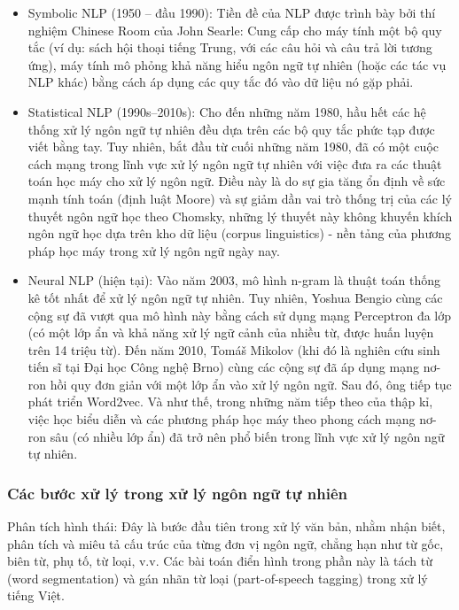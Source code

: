 \begin{itemize}
    \item Symbolic NLP (1950 – đầu 1990): Tiền đề của NLP được trình bày bởi thí nghiệm Chinese Room của John Searle: Cung cấp cho máy tính một bộ quy tắc (ví dụ: sách hội thoại tiếng Trung, với các câu hỏi và câu trả lời tương ứng), máy tính mô phỏng khả năng hiểu ngôn ngữ tự nhiên (hoặc các tác vụ NLP khác) bằng cách áp dụng các quy tắc đó vào dữ liệu nó gặp phải.
    \item Statistical NLP (1990s–2010s): Cho đến những năm 1980, hầu hết các hệ thống xử lý ngôn ngữ tự nhiên đều dựa trên các bộ quy tắc phức tạp được viết bằng tay. Tuy nhiên, bắt đầu từ cuối những năm 1980, đã có một cuộc cách mạng trong lĩnh vực xử lý ngôn ngữ tự nhiên với việc đưa ra các thuật toán học máy cho xử lý ngôn ngữ. Điều này là do sự gia tăng ổn định về sức mạnh tính toán (định luật Moore) và sự giảm dần vai trò thống trị của các lý thuyết ngôn ngữ học theo Chomsky, những lý thuyết này không khuyến khích ngôn ngữ học dựa trên kho dữ liệu (corpus linguistics) - nền tảng của phương pháp học máy trong xử lý ngôn ngữ ngày nay.
    \item Neural NLP (hiện tại): Vào năm 2003, mô hình n-gram là thuật toán thống kê tốt nhất để xử lý ngôn ngữ tự nhiên. Tuy nhiên, Yoshua Bengio cùng các cộng sự đã vượt qua mô hình này bằng cách sử dụng mạng Perceptron đa lớp (có một lớp ẩn và khả năng xử lý ngữ cảnh của nhiều từ, được huấn luyện trên 14 triệu từ). Đến năm 2010, Tomáš Mikolov (khi đó là nghiên cứu sinh tiến sĩ tại Đại học Công nghệ Brno) cùng các cộng sự đã áp dụng mạng nơ-ron hồi quy đơn giản với một lớp ẩn vào xử lý ngôn ngữ. Sau đó, ông tiếp tục phát triển Word2vec. Và như thế, trong những năm tiếp theo của thập kỉ, việc học biểu diễn và các phương pháp học máy theo phong cách mạng nơ-ron sâu (có nhiều lớp ẩn) đã trở nên phổ biến trong lĩnh vực xử lý ngôn ngữ tự nhiên. 
\end{itemize}

\subsubsection{Các bước xử lý trong xử lý ngôn ngữ tự nhiên}

Phân tích hình thái: Đây là bước đầu tiên trong xử lý văn bản, nhằm nhận biết, phân tích và miêu tả cấu trúc của từng đơn vị ngôn ngữ, chẳng hạn như từ gốc, biên từ, phụ tố, từ loại, v.v. Các bài toán điển hình trong phần này là tách từ (word segmentation) và gán nhãn từ loại (part-of-speech tagging) trong xử lý tiếng Việt. 

